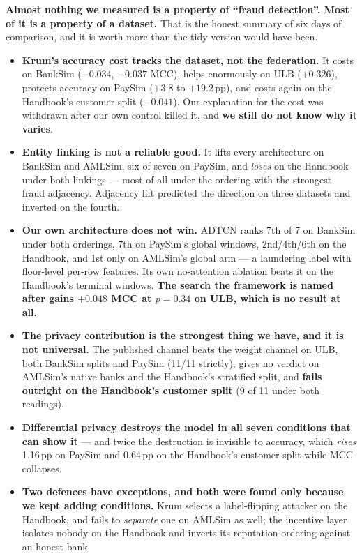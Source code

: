 \documentclass[11pt]{article}
\begin{document}
\textbf{Almost nothing we measured is a property of ``fraud detection''. Most of it is a property of a
dataset.} That is the honest summary of six days of comparison, and it is worth more than the tidy version
would have been.

\begin{itemize}\itemsep3pt
  \item \textbf{Krum's accuracy cost tracks the dataset, not the federation.} It costs on BankSim
        ($-0.034$, $-0.037$ MCC), helps enormously on ULB ($+0.326$), protects accuracy on PaySim
        ($+3.8$ to $+19.2$\,pp), and costs again on the Handbook's customer split ($-0.041$). Our
        explanation for the cost was withdrawn after our own control killed it, and \textbf{we still do
        not know why it varies}.
  \item \textbf{Entity linking is not a reliable good.} It lifts every architecture on BankSim and
        AMLSim, six of seven on PaySim, and \emph{loses} on the Handbook under both linkings --- most of
        all under the ordering with the strongest fraud adjacency. Adjacency lift predicted the direction
        on three datasets and inverted on the fourth.
  \item \textbf{Our own architecture does not win.} ADTCN ranks 7th of 7 on BankSim under both orderings,
        7th on PaySim's global windows, 2nd/4th/6th on the Handbook, and 1st only on AMLSim's global arm
        --- a laundering label with floor-level per-row features. Its own no-attention ablation beats it
        on the Handbook's terminal windows. \textbf{The search the framework is named after gains
        $+0.048$ MCC at $p = 0.34$ on ULB, which is no result at all.}
  \item \textbf{The privacy contribution is the strongest thing we have, and it is not universal.} The
        published channel beats the weight channel on ULB, both BankSim splits and PaySim (11/11
        strictly), gives no verdict on AMLSim's native banks and the Handbook's stratified split, and
        \textbf{fails outright on the Handbook's customer split} (9 of 11 under both readings).
  \item \textbf{Differential privacy destroys the model in all seven conditions that can show it} --- and
        twice the destruction is invisible to accuracy, which \emph{rises} 1.16\,pp on PaySim and
        0.64\,pp on the Handbook's customer split while MCC collapses.
  \item \textbf{Two defences have exceptions, and both were found only because we kept adding
        conditions.} Krum selects a label-flipping attacker on the Handbook, and fails to \emph{separate}
        one on AMLSim as well; the incentive layer isolates nobody on the Handbook and inverts its
        reputation ordering against an honest bank.
\end{itemize}
\end{document}
